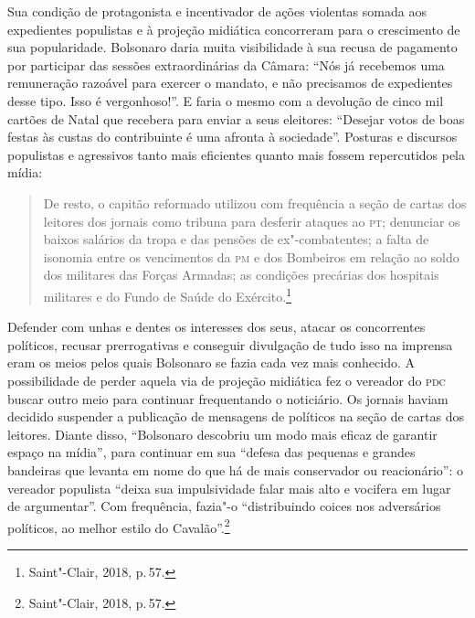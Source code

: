 Sua condição de protagonista e incentivador de ações violentas somada
aos expedientes populistas e à projeção midiática concorreram para o
crescimento de sua popularidade. Bolsonaro daria muita visibilidade à
sua recusa de pagamento por participar das sessões extraordinárias da
Câmara: ``Nós já recebemos uma remuneração razoável para exercer o
mandato, e não precisamos de expedientes desse tipo. Isso é
vergonhoso!''. E faria o mesmo com a devolução de cinco mil cartões de
Natal que recebera para enviar a seus eleitores: ``Desejar votos de boas
festas às custas do contribuinte é uma afronta à sociedade''. Posturas e
discursos populistas e agressivos tanto mais eficientes quanto mais
fossem repercutidos pela mídia:

\begin{quote}
De resto, o capitão reformado utilizou com frequência a seção de cartas
dos leitores dos jornais como tribuna para desferir ataques ao \textsc{pt};
denunciar os baixos salários da tropa e das pensões de ex"-combatentes; a
falta de isonomia entre os vencimentos da \textsc{pm} e dos Bombeiros em relação
ao soldo dos militares das Forças Armadas; as condições precárias dos
hospitais militares e do Fundo de Saúde do Exército.\footnote{Saint"-Clair,
  2018, p.\,57.}
\end{quote}

Defender com unhas e dentes os interesses dos seus, atacar os
concorrentes políticos, recusar prerrogativas e conseguir divulgação de
tudo isso na imprensa eram os meios pelos quais Bolsonaro se fazia cada
vez mais conhecido. A possibilidade de perder aquela via de projeção
midiática fez o vereador do \textsc{pdc} buscar outro meio para continuar
frequentando o noticiário. Os jornais haviam decidido suspender a
publicação de mensagens de políticos na seção de cartas dos leitores.
Diante disso, ``Bolsonaro descobriu um modo mais eficaz de garantir
espaço na mídia'', para continuar em sua ``defesa das pequenas e grandes
bandeiras que levanta em nome do que há de mais conservador ou
reacionário'': o vereador populista ``deixa sua impulsividade falar mais
alto e vocifera em lugar de argumentar''. Com frequência, fazia"-o
``distribuindo coices nos adversários políticos, ao melhor estilo do
Cavalão''.\footnote{Saint"-Clair, 2018, p.\,57.}


